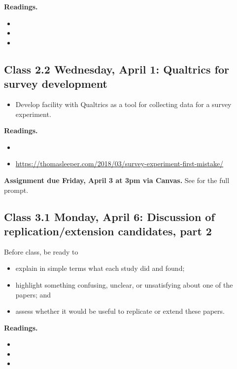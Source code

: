 \documentclass[letterpaper, 12pt, parskip=full, DIV=10]{scrartcl}
\begin{document}
\textbf{Readings.}
\begin{itemize}
\item {}
\item {}
\item {}
\end{itemize}

\subsection*{Class 2.2 Wednesday, April 1: Qualtrics for survey development}
\begin{itemize}
\item Develop facility with Qualtrics as a tool for collecting data for a survey experiment.
\end{itemize}

\textbf{Readings.}
\begin{itemize}
\item {}
\item {} \url{https://thomasleeper.com/2018/03/survey-experiment-first-mistake/}
\end{itemize}

\textbf{Assignment due Friday, April 3 at 3pm via Canvas.}
See  for the full prompt.

\subsection*{Class 3.1 Monday, April 6: Discussion of replication/extension candidates, part 2}
Before class, be ready to
\begin{itemize}
\item explain in simple terms what each study did and found;
\item highlight something confusing, unclear, or unsatisfying about one of the papers; and
\item assess whether it would be useful to replicate or extend these papers.
\end{itemize}

\textbf{Readings.}
\begin{itemize}
\item {}
\item {}
\item {}
\end{itemize}
\end{document}
